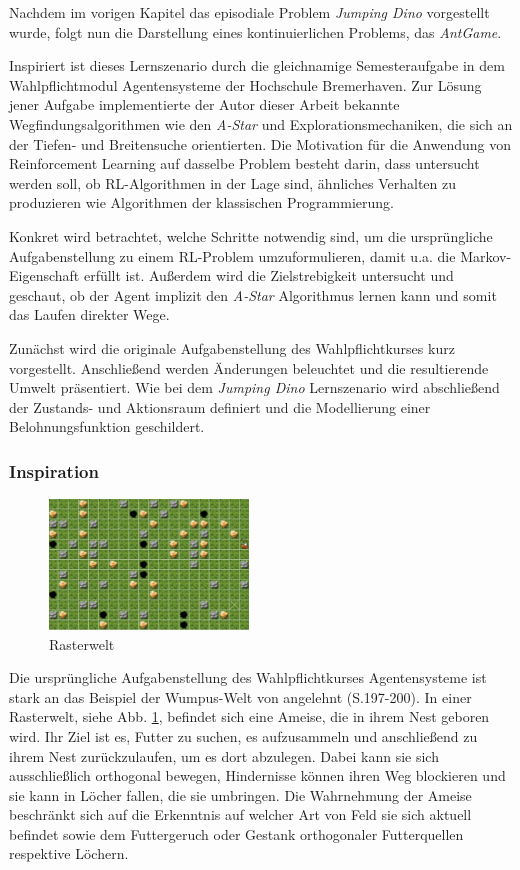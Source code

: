 Nachdem im vorigen Kapitel das episodiale Problem \textit{Jumping Dino} vorgestellt wurde, folgt nun die Darstellung eines kontinuierlichen Problems, das \textit{AntGame}.
\par 
Inspiriert ist dieses Lernszenario durch die gleichnamige Semesteraufgabe in dem Wahlpflichtmodul \glqq Agentensysteme\grqq{} der Hochschule Bremerhaven. Zur Lösung jener Aufgabe implementierte der Autor dieser Arbeit bekannte Wegfindungsalgorithmen wie den \textit{A-Star} und Explorationsmechaniken, die sich an der Tiefen- und Breitensuche orientierten. Die Motivation für die Anwendung von Reinforcement Learning auf dasselbe Problem besteht darin, dass untersucht werden soll, ob RL-Algorithmen in der Lage sind, ähnliches Verhalten zu produzieren wie Algorithmen der klassischen Programmierung.
\par 
Konkret wird betrachtet, welche Schritte notwendig sind, um die ursprüngliche Aufgabenstellung zu einem RL-Problem umzuformulieren, damit u.a. die Markov-Eigenschaft erfüllt ist. Außerdem wird die Zielstrebigkeit untersucht und geschaut, ob der Agent implizit den \textit{A-Star} Algorithmus lernen kann und somit das Laufen direkter Wege.
\par 
Zunächst wird die originale Aufgabenstellung des Wahlpflichtkurses kurz vorgestellt. Anschließend werden Änderungen beleuchtet und die resultierende Umwelt präsentiert. Wie bei dem \textit{Jumping Dino} Lernszenario wird abschließend der Zustands- und Aktionsraum definiert und die Modellierung einer Belohnungsfunktion geschildert.

\subsubsection{Inspiration}
\begin{figure}
    \begin{center}
    \includegraphics[width=200px]{images/rasterwelt.png}  \end{center}
    \caption{Rasterwelt}
    \label{fig:rasterwelt}
  \end{figure}
Die ursprüngliche Aufgabenstellung des Wahlpflichtkurses \glqq Agentensysteme\grqq{} ist stark an das Beispiel der \glqq Wumpus-Welt\grqq{} von \cite{wumpus} angelehnt (S.197-200). In einer Rasterwelt, siehe Abb. \ref{fig:rasterwelt}, befindet sich eine Ameise, die in ihrem Nest geboren wird. Ihr Ziel ist es, Futter zu suchen, es aufzusammeln und anschließend zu ihrem Nest zurückzulaufen, um es dort abzulegen. Dabei kann sie sich ausschließlich orthogonal bewegen, Hindernisse können ihren Weg blockieren und sie kann in Löcher fallen, die sie umbringen. Die Wahrnehmung der Ameise beschränkt sich auf die Erkenntnis auf welcher Art von Feld sie sich aktuell befindet sowie dem Futtergeruch oder Gestank orthogonaler Futterquellen respektive Löchern. 

